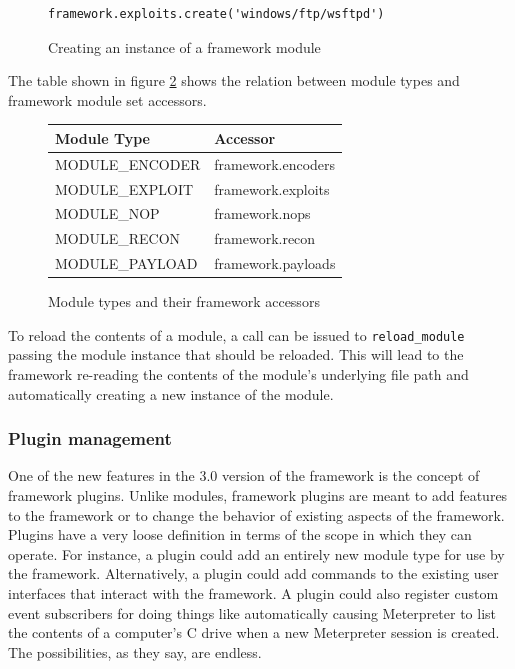 \documentclass{report}
\begin{document}
\begin{figure}[h]
\begin{verbatim}
framework.exploits.create('windows/ftp/wsftpd')
\end{verbatim}
\caption{Creating an instance of a framework module}
\label{fig-code-framework-modcreate}
\end{figure}

\par
The table shown in figure \ref{fig-table-modulsets} shows the
relation between module types and framework module set accessors.

\begin{figure}[h]
\begin{center}
\begin{tabular}{|l|l|}
\hline
\textbf{Module Type} & \textbf{Accessor} \\
\hline
MODULE\_ENCODER & framework.encoders \\
MODULE\_EXPLOIT & framework.exploits \\
MODULE\_NOP & framework.nops \\
MODULE\_RECON & framework.recon \\
MODULE\_PAYLOAD & framework.payloads \\
\hline
\end{tabular}
\caption{Module types and their framework accessors}
\label{fig-table-modulsets}
\end{center}
\end{figure}

\par
To reload the contents of a module, a call can be issued to
\texttt{reload\_module} passing the module instance that should be
reloaded.  This will lead to the framework re-reading the contents
of the module's underlying file path and automatically creating a
new instance of the module.

            \subsubsection{Plugin management}

\par
One of the new features in the 3.0 version of the framework is the
concept of framework plugins.  Unlike modules, framework plugins are
meant to add features to the framework or to change the behavior of
existing aspects of the framework.  Plugins have a very loose
definition in terms of the scope in which they can operate.  For
instance, a plugin could add an entirely new module type for use by
the framework.  Alternatively, a plugin could add commands to the
existing user interfaces that interact with the framework.  A plugin
could also register custom event subscribers for doing things like
automatically causing Meterpreter to list the contents of a
computer's C drive when a new Meterpreter session is created.  The
possibilities, as they say, are endless.
\end{document}
